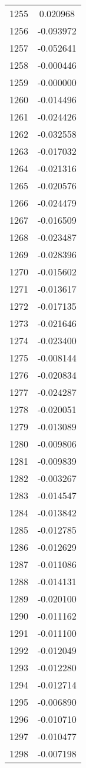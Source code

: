 \documentclass[12pt]{article}
\begin{document}
\begin{longtable}{@{}cc@{}}
1255 & 0.020968 \\
1256 & -0.093972 \\
1257 & -0.052641 \\
1258 & -0.000446 \\
1259 & -0.000000 \\
1260 & -0.014496 \\
1261 & -0.024426 \\
1262 & -0.032558 \\
1263 & -0.017032 \\
1264 & -0.021316 \\
1265 & -0.020576 \\
1266 & -0.024479 \\
1267 & -0.016509 \\
1268 & -0.023487 \\
1269 & -0.028396 \\
1270 & -0.015602 \\
1271 & -0.013617 \\
1272 & -0.017135 \\
1273 & -0.021646 \\
1274 & -0.023400 \\
1275 & -0.008144 \\
1276 & -0.020834 \\
1277 & -0.024287 \\
1278 & -0.020051 \\
1279 & -0.013089 \\
1280 & -0.009806 \\
1281 & -0.009839 \\
1282 & -0.003267 \\
1283 & -0.014547 \\
1284 & -0.013842 \\
1285 & -0.012785 \\
1286 & -0.012629 \\
1287 & -0.011086 \\
1288 & -0.014131 \\
1289 & -0.020100 \\
1290 & -0.011162 \\
1291 & -0.011100 \\
1292 & -0.012049 \\
1293 & -0.012280 \\
1294 & -0.012714 \\
1295 & -0.006890 \\
1296 & -0.010710 \\
1297 & -0.010477 \\
1298 & -0.007198 \\

\end{longtable}
\end{document}
